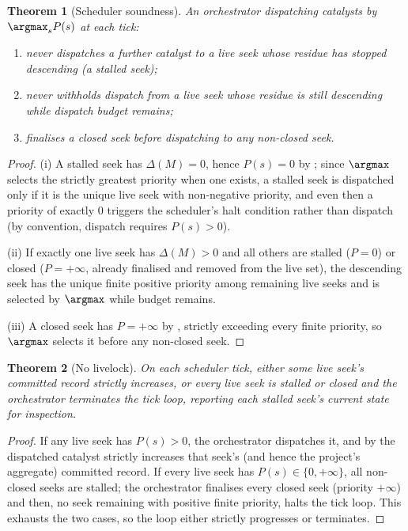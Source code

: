 \documentclass[11pt,twocolumn,a4paper]{article}
\theoremstyle{thmstyle}
\newtheorem{theorem}{Theorem}[section]
\theoremstyle{definition}
\theoremstyle{remark}
\newcommand{\rec}{M}
\begin{document}
\begin{theorem}[Scheduler soundness]
\label{thm:scheduler-sound}
An orchestrator dispatching catalysts by $\argmax_s P(s)$ at each tick:
\begin{enumerate}[label=\textup{(\roman*)},leftmargin=2.2em]
\item never dispatches a further catalyst to a live seek whose residue has
stopped descending (a \emph{stalled} seek);
\item never withholds dispatch from a live seek whose residue is still
descending while dispatch budget remains;
\item finalises a closed seek before dispatching to any non-closed seek.
\end{enumerate}
\end{theorem}

\begin{proof}
(i) A stalled seek has $\Delta(\rec)=0$, hence $P(s)=0$ by
; since $\argmax$ selects the strictly
greatest priority when one exists, a stalled seek is dispatched only if it
is the unique live seek with non-negative priority, and even then a
priority of exactly $0$ triggers the scheduler's halt condition rather
than dispatch (by convention, dispatch requires $P(s)>0$).

(ii) If exactly one live seek has $\Delta(\rec)>0$ and all others are
stalled ($P=0$) or closed ($P=+\infty$, already finalised and removed from
the live set), the descending seek has the unique finite positive
priority among remaining live seeks and is selected by $\argmax$ while
budget remains.

(iii) A closed seek has $P=+\infty$ by ,
strictly exceeding every finite priority, so $\argmax$ selects it before
any non-closed seek.
\end{proof}

\begin{theorem}[No livelock]
\label{thm:no-livelock}
On each scheduler tick, either some live seek's committed record strictly
increases, or every live seek is stalled or closed and the orchestrator
terminates the tick loop, reporting each stalled seek's current state for
inspection.
\end{theorem}

\begin{proof}
If any live seek has $P(s)>0$, the orchestrator dispatches it, and by
 the dispatched catalyst strictly increases that
seek's (and hence the project's aggregate) committed record. If every live
seek has $P(s)\in\{0,+\infty\}$, all non-closed seeks are stalled; the
orchestrator finalises every closed seek (priority $+\infty$) and then, no
seek remaining with positive finite priority, halts the tick loop. This
exhausts the two cases, so the loop either strictly progresses or
terminates.
\end{proof}
\end{document}
